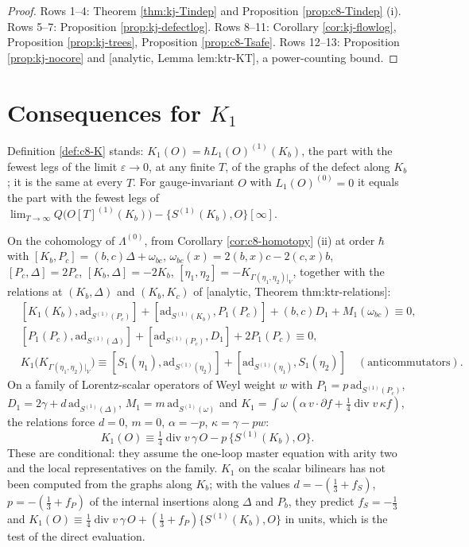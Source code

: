 \begin{proof}
Rows 1--4: Theorem \ref{thm:kj-Tindep} and Proposition \ref{prop:c8-Tindep} (i). Rows 5--7: Proposition \ref{prop:kj-defectlog}. Rows 8--11: Corollary \ref{cor:kj-flowlog}, Proposition \ref{prop:kj-trees}, Proposition \ref{prop:c8-Tsafe}. Rows 12--13: Proposition \ref{prop:kj-nocore} and [analytic, Lemma lem:ktr-KT], a power-counting bound.
\end{proof}

\section{Consequences for $K_1$}

\begin{definition}
\label{def:kj-K1}
Definition \ref{def:c8-K} stands: $K_1(O)=\hbar L_1(O)^{(1)}(K_b)$, the part with the fewest legs of the limit $\varepsilon\to0$, at any finite $T$, of the graphs of the defect along $K_b$; it is the same at every $T$. For gauge-invariant $O$ with $L_1(O)^{(0)}=0$ it equals the part with the fewest legs of $\lim_{T\to\infty}Q\big(O[T]^{(1)}(K_b)\big)-\{S^{(1)}(K_b),O\}[\infty]$.
\end{definition}

\begin{proposition}
\label{prop:kj-relations}
On the cohomology of $\Lambda^{(0)}$, from Corollary \ref{cor:c8-homotopy} (ii) at order $\hbar$ with $[K_b,P_c]=(b,c)\Delta+\omega_{bc}$, $\omega_{bc}(x)=2(b,x)c-2(c,x)b$, $[P_c,\Delta]=2P_c$, $[K_b,\Delta]=-2K_b$, $[\eta_1,\eta_2]=-K_{\Gamma(\eta_1,\eta_2)|_V}$, together with the relations at $(K_b,\Delta)$ and $(K_b,K_c)$ of [analytic, Theorem thm:ktr-relations]:
\[
\begin{aligned}
&[K_1(K_b),\mathrm{ad}_{S^{(1)}(P_c)}]+[\mathrm{ad}_{S^{(1)}(K_b)},P_1(P_c)]+(b,c)D_1+M_1(\omega_{bc})\equiv0,\\
&[P_1(P_c),\mathrm{ad}_{S^{(1)}(\Delta)}]+[\mathrm{ad}_{S^{(1)}(P_c)},D_1]+2P_1(P_c)\equiv0,\\
&K_1\big(K_{\Gamma(\eta_1,\eta_2)|_V}\big)\equiv[S_1(\eta_1),\mathrm{ad}_{S^{(1)}(\eta_2)}]+[\mathrm{ad}_{S^{(1)}(\eta_1)},S_1(\eta_2)]\quad(\text{anticommutators}).
\end{aligned}
\]
On a family of Lorentz-scalar operators of Weyl weight $w$ with $P_1=p\,\mathrm{ad}_{S^{(1)}(P_c)}$, $D_1=2\gamma+d\,\mathrm{ad}_{S^{(1)}(\Delta)}$, $M_1=m\,\mathrm{ad}_{S^{(1)}(\omega)}$ and $K_1=\int\omega\,(\alpha\,v\cdot\partial f+\tfrac14\operatorname{div}v\,\kappa f)$, the relations force $d=0$, $m=0$, $\alpha=-p$, $\kappa=\gamma-pw$:
\[
K_1(O)\equiv\tfrac14\operatorname{div}v\,\gamma\,O-p\,\{S^{(1)}(K_b),O\}.
\]
These are conditional: they assume the one-loop master equation with arity two and the local representatives on the family. $K_1$ on the scalar bilinears has not been computed from the graphs along $K_b$; with the values $d=-(\tfrac13+f_S)$, $p=-(\tfrac13+f_P)$ of the internal insertions along $\Delta$ and $P_b$, they predict $f_S=-\tfrac13$ and $K_1(O)\equiv\tfrac14\operatorname{div}v\,\gamma\,O+(\tfrac13+f_P)\{S^{(1)}(K_b),O\}$ in units, which is the test of the direct evaluation.
\end{proposition}

